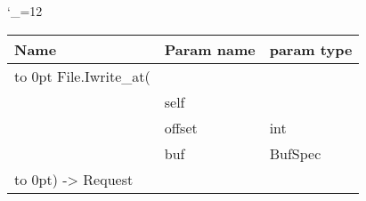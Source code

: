 \begingroup \catcode`\_=12 \tt
\begin{tabular}{lll}
\toprule
\textrm{Name}&\textrm{Param name}&\textrm{param type}\\
\midrule
\hbox to 0pt {File.Iwrite_at(\hss}\\
& self\\
& offset & int\\
& buf & BufSpec\\
\hbox to 0pt{) -> Request\hss}\\
\bottomrule
\end{tabular}
\endgroup
